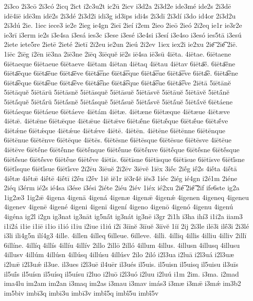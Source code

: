 {2i3co
2i3cō
2i3có
2icq
2ict
i2c3u2t
ic2ū
2icv
i3d2a
2i3d2e
ide3mé
ide2s
2i3dē
idē4iē
idē3m
idē2s
2i3dé
2i3d2i
idi3g
id3ips
idi4s
2i3dī
2i3dí
i3do
id4or
2i3d2u
2i3dú
2ie.
1iec
iece3
ie2e
2ieg
ie4gn
2ieī
2ieí
i2em
2ieo
2ieō
2ieó
2i2eq
ie1r
ie3r2e
ie3rī
i3erm
ie2s
i3e4sa
i3esá
ies3c
i3ese
i3esé
i3e4si
i3esí
i3e4so
i3esó
ies5tā
i3esú
2iete
iete5re
2ietē
2ieté
2ietī
2i2eu
ie2un
2ieú
2i2ev
1iex
iex2i
ie2xu
2ie͞
2ie͡
2iē.
1iēc
2iēg
i2ēn
iē3na
2iē3ne
2iēq
3iēquĕ
iē2s
iē4sa
iē3sū
4iēta.
4iētae.
6iētaene
6iētaeque
6iētaeue
6iētaeve
4iētam
4iētan
4iētaq
4iētau
4iētav
6iēta͞e.
6iēta͞ene
6iēta͞eque
6iēta͞eue
6iēta͞eve
6iētá͞ene
6iētá͞eque
6iētá͞eue
6iētá͞eve
6iēta͡e.
6iēta͡ene
6iēta͡eque
6iēta͡eue
6iēta͡eve
6iētá͡ene
6iētá͡eque
6iētá͡eue
6iētá͡eve
2iētā
5iētānĕ
5iētāquĕ
5iētārŭ
5iētāsnĕ
5iētāsquĕ
5iētāsuĕ
5iētāsvĕ
5iētāuĕ
5iētāvĕ
5iētā́nĕ
5iētā́quĕ
5iētā́rŭ
5iētā́snĕ
5iētā́squĕ
5iētā́suĕ
5iētā́svĕ
5iētā́uĕ
5iētā́vĕ
6iētáene
6iētáeque
6iētáeue
6iētáeve
4iētám
4iētæ.
4iētæne
6iētæque
4iētæue
4iētæve
4iētǣ.
4iētǣne
6iētǣque
4iētǣue
4iētǣve
6iētǣ́ne
6iētǣ́que
6iētǣ́ue
6iētǣ́ve
4iētǽne
6iētǽque
4iētǽue
4iētǽve
4iētē.
4iētēn.
4iētēne
6iētēnne
6iētēnque
6iētēnue
6iētēnve
6iētēque
4iētēs.
6iētēsne
6iētēsque
6iētēsue
6iētēsve
4iētēue
4iētēve
6iētḗne
6iētḗnne
6iētḗnque
6iētḗnue
6iētḗnve
6iētḗque
6iētḗsne
6iētḗsque
6iētḗsue
6iētḗsve
6iētḗue
6iētḗve
4iētīs.
6iētīsne
6iētīsque
6iētīsue
6iētīsve
6iētī́sne
6iētī́sque
6iētī́sue
6iētī́sve
2i2ēu
3iēuĕ
2i2ēv
3iēvĕ
1iēx
3iḗc
2iḗg
iḗ2s
4iḗta
4iḗtā
4iḗtæ
4iḗtǣ
4iḗtē
4iḗtī
i2ḗu
i2ḗv
1iĕ
iĕ1r
iĕ3r4ĕ
iĕs3
1iéc
2iég
ié4gn
i2é1m
2iéne
2iéq
i3érm
ié2s
ié4sa
i3ése
i3ési
2iéte
2iéu
2iév
1iéx
ié2xu
2ié͞
2ié͡
2if
ife6ste
ig2a
1ig2æ3
1ig2ǣ
4igena
4igenā
4igená
4igenæ
4igenǣ
4igenǽ
4igenen
4igeneq
4igeneu
4igenev
4igenē
4igené
4igeni
4igenī
4igení
4igeno
4igenō
4igenó
4igenu
4igenú
4igéna
ig2l
i2gn
ig3nat
ig3nāt
ig5nā́t
ig3nát
ig3nē
i3gr
2i1h
i3ha
ihí3
i1i2a
iiam3
i1i2á
i1ie
i1iē
i1io
i1ió
i1iu
i2iue
i1iú
i2ī
3iīnĕ
3iīuĕ
3iīvĕ
1iĭ
2ij
2i3le
ilē3i
ilḗ3i
2i3lé
i3li
ili4g5n
ilí4g3
4ille.
4illen
4illeq
6illeue.
6illeve.
4illi.
4illiq
4illis
4illiu
4illiv
2illī
6illíne.
4illíq
4illís
4illíu
4illív
2illo
2illō
2illó
4illum
4illus.
4illusn
4illusq
4illusu
4illusv
4illúm
4illúsn
4illúsq
4illúsu
4illúsv
2ilo
2iló
i2l3ua
i2luā
i2l3uá
i2l3uæ
i2luǣ
i2l3uǽ
il3ue.
il3ues
i2l3uē
il4uēr
il3ués
il5uis.
il5uisn
il5uisq
il5uisu
il3uīs
il5uī́s
il5uísn
il5uísq
il5uísu
i2luo
i2luō
i2l3uó
i2luu
i2luú
i1m
2im.
i3ma.
i2mad
ima4lu
im2am
im2an
i3maq
im2as
i3mau
i3mav
imás3
i3mæ
i3mǣ
i3mǽ
im3b2
im5biv
imbī3q
imbī3u
imbī3v
imbī́5q
imbī́5u
imbī́5v
}
